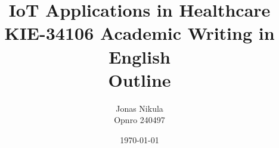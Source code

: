 \documentclass{article}
\title{IoT Applications in Healthcare \\ KIE-34106 Academic Writing in English \\ Outline} %
\author{Jonas Nikula \\ Opnro 240497} %
\date{\today} %
\begin{document}
\maketitle %





\printbibliography{}

\end{document}
